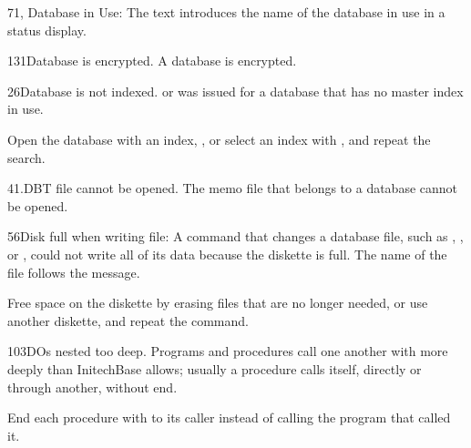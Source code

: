 \begin{XbaseMessageEntry}{71}{, Database in Use:}
The text introduces the name of the database in use in a status display.
\end{XbaseMessageEntry}

\begin{XbaseMessageEntry}{131}{Database is encrypted.}
A database is encrypted.
\end{XbaseMessageEntry}

\begin{XbaseMessageEntry}{26}{Database is not indexed.}
 or  was issued for a database that has no master index in use.

Open the database with an index, , or select an index with , and repeat the search.
\end{XbaseMessageEntry}

\begin{XbaseMessageEntry}{41}{.DBT file cannot be opened.}
The memo file that belongs to a database cannot be opened.
\end{XbaseMessageEntry}

\begin{XbaseMessageEntry}{56}{Disk full when writing file:}
A command that changes a database file, such as , ,  or , could not write all of its data because the diskette is full. The name of the file follows the message.

Free space on the diskette by erasing files that are no longer needed, or use another diskette, and repeat the command.
\end{XbaseMessageEntry}

\begin{XbaseMessageEntry}{103}{DOs nested too deep.}
Programs and procedures call one another with  more deeply than InitechBase allows; usually a procedure calls itself, directly or through another, without end.

End each procedure with  to its caller instead of calling the program that called it.
\end{XbaseMessageEntry}

